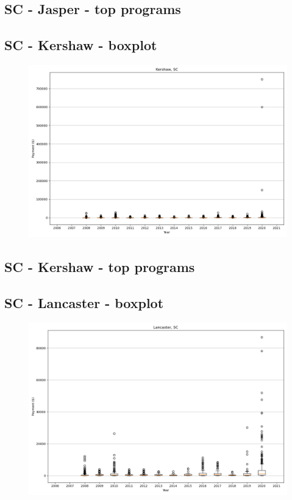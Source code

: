 \subsection*{SC - Jasper - top programs}

\newpage
\subsection*{SC - Kershaw - boxplot}
\begin{figure}[h]
\centering
\includegraphics[width=7in]{../output/boxplots/counties/Kershaw-SC_boxplot.png}
\end{figure}


\subsection*{SC - Kershaw - top programs}

\newpage
\subsection*{SC - Lancaster - boxplot}
\begin{figure}[h]
\centering
\includegraphics[width=7in]{../output/boxplots/counties/Lancaster-SC_boxplot.png}
\end{figure}


